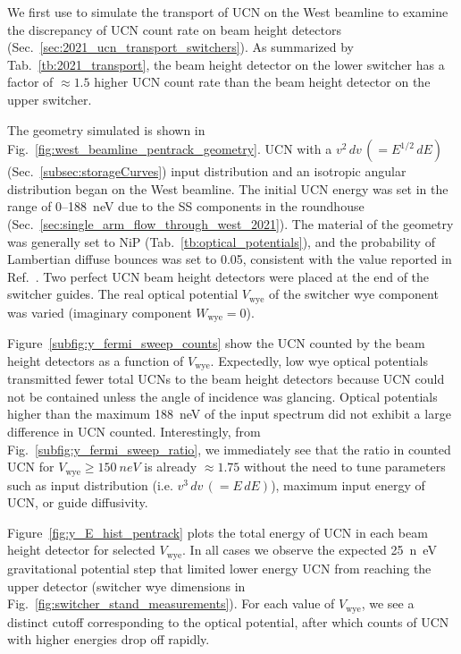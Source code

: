 We first use \pentrack to simulate the transport of UCN on the West beamline to examine the discrepancy of UCN count rate on beam height detectors (Sec.~\ref{sec:2021_ucn_transport_switchers}). As summarized by Tab.~\ref{tb:2021_transport}, the beam height detector on the lower switcher has a factor of $\approx1.5$ higher UCN count rate than the beam height detector on the upper switcher.

The geometry simulated is shown in Fig.~\ref{fig:west_beamline_pentrack_geometry}. UCN with a $v^2\,dv\,(=E^{1/2}\,dE)$ (Sec.~\ref{subsec:storageCurves}) input distribution and an isotropic angular distribution began on the West beamline. The initial UCN energy was set in the range of 0--\qty{188}{\nano\eV} due to the SS components in the roundhouse (Sec.~\ref{sec:single_arm_flow_through_west_2021}). The material of the geometry was generally set to NiP (Tab.~\ref{tb:optical_potentials}), and the probability of Lambertian diffuse bounces was set to 0.05, consistent with the value reported in Ref.~\cite{saunders_performance_2013}. Two perfect UCN beam height detectors were placed at the end of the switcher guides. The real optical potential $V_\text{wye}$ of the switcher wye component was varied (imaginary component $W_\text{wye}=0$).

Figure~\ref{subfig:y_fermi_sweep_counts} show the UCN counted by the beam height detectors as a function of $V_\text{wye}$. Expectedly, low wye optical potentials transmitted fewer total UCNs to the beam height detectors because UCN could not be contained unless the angle of incidence was glancing. Optical potentials higher than the maximum \qty{188}{neV} of the input spectrum did not exhibit a large difference in UCN counted. Interestingly, from Fig.~\ref{subfig:y_fermi_sweep_ratio}, we immediately see that the ratio in counted UCN for $V_\text{wye}\geq \qty{150}{neV}$ is already $\approx 1.75$ without the need to tune parameters such as input distribution (i.e. $v^3\,dv\,(=E\,dE)$), maximum input energy of UCN, or guide diffusivity.

Figure~\ref{fig:y_E_hist_pentrack} plots the total energy of UCN in each beam height detector for selected $V_\text{wye}$. In all cases we observe the expected \qty{25}{n\eV} gravitational potential step that limited lower energy UCN from reaching the upper detector (switcher wye dimensions in Fig.~\ref{fig:switcher_stand_measurements}). For each value of $V_\text{wye}$, we see a distinct cutoff corresponding to the optical potential, after which counts of UCN with higher energies drop off rapidly.

